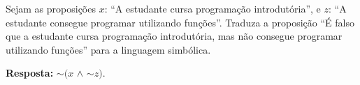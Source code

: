 \documentclass{ufcdocument}
\begin{document}
\def\course{Lógica para Ciência da Computação}
\def\prof{Esdras Lins Bispo Jr.}
\def\semester{2026.1}
\def\codeCourse{ICE0239}
\def\registration{}
\def\student{}
\def\graduate{Bacharelado em Ciência da Computação}
\def\theme{Avaliação da Competência LCC C1.2:\\ \texttt{Conversão da linguagem natural para simbólica.}\\
}
    \makeheader
    
    \vspace{0.5cm}
    
     \begin{question}
        \item Sejam as proposições $x$: ``A estudante cursa programação introdutória'', e $z$: ``A estudante consegue programar utilizando funções''. Traduza  a proposição ``É falso que a estudante cursa programação introdutória, mas não consegue programar utilizando funções'' para a linguagem simbólica.
    \end{question}

    \vspace{0.3cm}
        
    {\color{blue} {\bf Resposta:} $\sim (x$ $\wedge$ $\sim z)$.}
 
    \vfill
\end{document}
